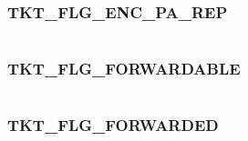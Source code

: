 \documentclass[letterpaper,10pt,english]{sphinxmanual}
\begin{document}
\subsubsection{TKT\_FLG\_ENC\_PA\_REP}
\label{appdev/refs/macros/TKT_FLG_ENC_PA_REP:tkt-flg-enc-pa-rep}\label{appdev/refs/macros/TKT_FLG_ENC_PA_REP:tkt-flg-enc-pa-rep-data}\label{appdev/refs/macros/TKT_FLG_ENC_PA_REP::doc}

\begin{fulllineitems}
\label{appdev/refs/macros/TKT_FLG_ENC_PA_REP:TKT_FLG_ENC_PA_REP}
\end{fulllineitems}


\begin{tabulary}{\linewidth}{|L|L|}
\hline

 & 
\\\hline
\end{tabulary}



\subsubsection{TKT\_FLG\_FORWARDABLE}
\label{appdev/refs/macros/TKT_FLG_FORWARDABLE:tkt-flg-forwardable-data}\label{appdev/refs/macros/TKT_FLG_FORWARDABLE:tkt-flg-forwardable}\label{appdev/refs/macros/TKT_FLG_FORWARDABLE::doc}

\begin{fulllineitems}
\label{appdev/refs/macros/TKT_FLG_FORWARDABLE:TKT_FLG_FORWARDABLE}
\end{fulllineitems}


\begin{tabulary}{\linewidth}{|L|L|}
\hline

 & 
\\\hline
\end{tabulary}



\subsubsection{TKT\_FLG\_FORWARDED}
\label{appdev/refs/macros/TKT_FLG_FORWARDED::doc}\label{appdev/refs/macros/TKT_FLG_FORWARDED:tkt-flg-forwarded}\label{appdev/refs/macros/TKT_FLG_FORWARDED:tkt-flg-forwarded-data}
\end{document}
